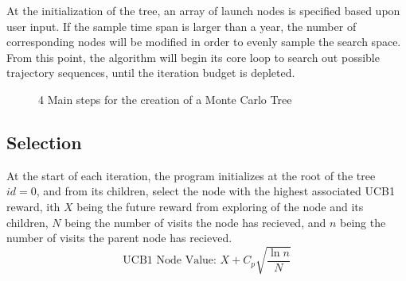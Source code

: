 \documentclass[letterpaper, preprint, paper,11pt]{AAS}	%
\newcommand*\circled[1]{\tikz[baseline=(char.base)]{
            \node[shape=circle,draw,inner sep=0.8pt] (char) {#1};}}
\begin{document}
At the initialization of the tree, an array of launch nodes is specified based upon user input. If the sample time span is larger than a year, the number of corresponding nodes will be modified in order to evenly sample the search space. From this point, the algorithm will begin its core loop to search out possible trajectory sequences, until the iteration budget is depleted. 


\begin{figure}
    \centering
    \caption{4 Main steps for the creation of a Monte Carlo Tree}
    \label{fig:mctsFunc}
\end{figure}

\subsection{Selection} 
At the start of each iteration, the program initializes at the root of the tree $id = 0$, and from its children, select the node with the highest associated UCB1 reward, ith $X$ being the future reward from exploring of the node and its children, $N$ being the number of visits the node has recieved, and $n$ being the number of visits the parent node has recieved. 
\begin{equation}
    \label{eq:UCB1}
    \text{UCB1 Node Value: } X + C_p \sqrt{\frac{\ln{n}}{N}}
\end{equation}
\end{document}
